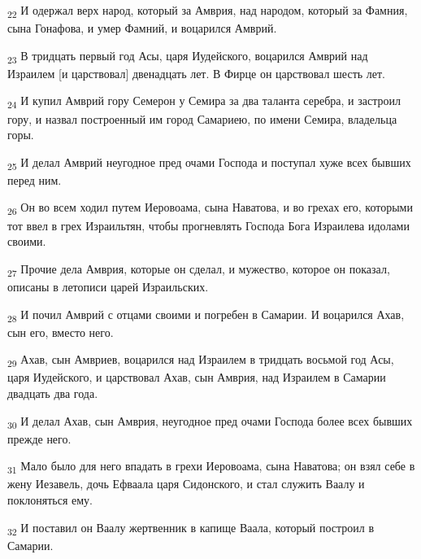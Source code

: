 \begin{tcolorbox}
\textsubscript{22} И одержал верх народ, который за Амврия, над народом, который за Фамния, сына Гонафова, и умер Фамний, и воцарился Амврий.
\end{tcolorbox}
\begin{tcolorbox}
\textsubscript{23} В тридцать первый год Асы, царя Иудейского, воцарился Амврий над Израилем [и царствовал] двенадцать лет. В Фирце он царствовал шесть лет.
\end{tcolorbox}
\begin{tcolorbox}
\textsubscript{24} И купил Амврий гору Семерон у Семира за два таланта серебра, и застроил гору, и назвал построенный им город Самариею, по имени Семира, владельца горы.
\end{tcolorbox}
\begin{tcolorbox}
\textsubscript{25} И делал Амврий неугодное пред очами Господа и поступал хуже всех бывших перед ним.
\end{tcolorbox}
\begin{tcolorbox}
\textsubscript{26} Он во всем ходил путем Иеровоама, сына Наватова, и во грехах его, которыми тот ввел в грех Израильтян, чтобы прогневлять Господа Бога Израилева идолами своими.
\end{tcolorbox}
\begin{tcolorbox}
\textsubscript{27} Прочие дела Амврия, которые он сделал, и мужество, которое он показал, описаны в летописи царей Израильских.
\end{tcolorbox}
\begin{tcolorbox}
\textsubscript{28} И почил Амврий с отцами своими и погребен в Самарии. И воцарился Ахав, сын его, вместо него.
\end{tcolorbox}
\begin{tcolorbox}
\textsubscript{29} Ахав, сын Амвриев, воцарился над Израилем в тридцать восьмой год Асы, царя Иудейского, и царствовал Ахав, сын Амврия, над Израилем в Самарии двадцать два года.
\end{tcolorbox}
\begin{tcolorbox}
\textsubscript{30} И делал Ахав, сын Амврия, неугодное пред очами Господа более всех бывших прежде него.
\end{tcolorbox}
\begin{tcolorbox}
\textsubscript{31} Мало было для него впадать в грехи Иеровоама, сына Наватова; он взял себе в жену Иезавель, дочь Ефваала царя Сидонского, и стал служить Ваалу и поклоняться ему.
\end{tcolorbox}
\begin{tcolorbox}
\textsubscript{32} И поставил он Ваалу жертвенник в капище Ваала, который построил в Самарии.
\end{tcolorbox}
